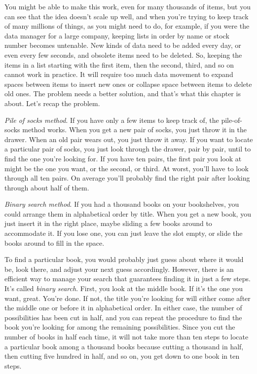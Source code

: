 You might be able to make this work, even for many thousands of items,
but you can see that the idea doesn't scale up well, and when you're
trying to keep track of many millions of things, as you might need to
do, for example, if you were the data manager for a large company,
keeping lists in order by name or stock number becomes
untenable. New kinds of data need to be added every day, or even every
few seconds, and obsolete items need to be deleted.
So, keeping the items in a list starting with the first item,
then the second, third, and so on cannot work in practice.
It will require too much data movement to expand spaces between
items to insert new ones or collapse space between items to delete old ones.
The problem needs a better solution,
and that's what this chapter is about.
Let's recap the problem.

\emph{Pile of socks method}.
If you have only a few items to keep track of,
the pile-of-socks method works.
When you get a new pair of socks, you just throw it in the drawer.
When an old pair wears out, you just throw it away.
If you want to locate a particular pair of socks,
you just look through the drawer,
pair by pair, until to find the one you're looking for.
If you have ten pairs, the first pair you look at might be
the one you want, or the second, or third.
At worst, you'll have to look through all ten pairs.
On average you'll probably find the right pair
after looking through about half of them.

\emph{Binary search method}.\label{binary-search-method}
If you had a thousand books on your bookshelves,
you could arrange them in alphabetical order by title.
When you get a new book, you just insert it in the right place,
maybe sliding a few books around to accommodate it.
If you lose one, you can just leave the slot empty,
or slide the books around to fill in the space.

To find a particular book, you would probably just guess about
where it would be, look there, and adjust your next guess accordingly.
However, there is an efficient way to manage your search that
guarantees finding it in just a few steps. It's called \emph{binary search}.
First, you look at the middle book.
If it's the one you want, great. You're done.
If not, the title you're looking for will either
come after the middle one or before it in alphabetical order.
In either case, the number of possibilities has been cut in half,
and you can repeat the procedure to find the book you're looking for
among the remaining possibilities.
Since you cut the number of books in half each time,
it will not take more than ten steps to locate
a particular book among a thousand books
because cutting a thousand in half, then cutting five hundred in half,
and so on, you get down to one book in ten steps.

